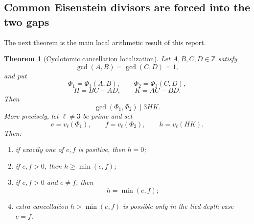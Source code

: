 \documentclass[11pt]{article}
\newtheorem{theorem}{Theorem}[section]
\theoremstyle{definition}
\theoremstyle{remark}
\newcommand{\Z}{\mathbb{Z}}
\begin{document}
\subsection{Common Eisenstein divisors are forced into the two gaps}

The next theorem is the main local arithmetic result of this report.

\begin{theorem}[Cyclotomic cancellation localization]\label{thm:localization}
Let $A,B,C,D\in\Z$ satisfy
\[
 \gcd(A,B)=\gcd(C,D)=1,
\]
and put
\[
 \Phi_1=\Phi_3(A,B),\qquad
 \Phi_2=\Phi_3(C,D),
\]
\[
 H=BC-AD,
 \qquad
 K=AC-BD.
\]
Then
\begin{equation}\label{eq:gcd-divides-HK}
 \gcd(\Phi_1,\Phi_2)\mid 3HK.
\end{equation}
More precisely, let $\ell\ne3$ be prime and set
\[
 e=v_\ell(\Phi_1),\qquad
 f=v_\ell(\Phi_2),\qquad
 h=v_\ell(HK).
\]
Then:
\begin{enumerate}
\item if exactly one of $e,f$ is positive, then $h=0$;
\item if $e,f>0$, then $h\ge\min(e,f)$;
\item if $e,f>0$ and $e\ne f$, then
\begin{equation}\label{eq:unequal-depth-exact}
 h=\min(e,f);
\end{equation}
\item extra cancellation $h>\min(e,f)$ is possible only in the tied-depth case $e=f$.
\end{enumerate}
\end{theorem}
\end{document}
